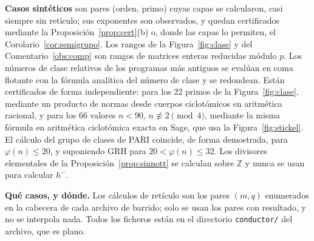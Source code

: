 \documentclass[11pt,a4paper]{article}
\theoremstyle{definition}
\newcommand{\ZZ}{\mathbb{Z}}
\begin{document}
\noindent\textbf{Casos sintéticos} son pares (orden, primo) cuyas capas se calcularon, casi siempre sin retículo; sus
exponentes son observados, y quedan certificados mediante la Proposición~\ref{prop:cert}(b) o, donde las capas lo
permiten, el Corolario~\ref{cor:semigrupo}. Los rangos de la
Figura~\ref{fig:clase} y del Comentario~\ref{obs:comp} son rangos de matrices enteras reducidas módulo $p$. Los números
de clase relativos de los programas más antiguos se evalúan en coma flotante con la fórmula analítica del número de
clase y se redondean. Están certificados de forma independiente: para los $22$ primos de la Figura~\ref{fig:clase},
mediante un producto de normas desde cuerpos ciclotómicos en aritmética racional, y para los $66$ valores $n<90$,
$n\not\equiv2\pmod4$, mediante la misma fórmula en aritmética ciclotómica exacta en Sage, que usa la
Figura~\ref{fig:stickel}. El cálculo del grupo de clases de PARI coincide, de forma demostrada, para $\varphi(n)\le20$, y
suponiendo GRH para $20<\varphi(n)\le32$. Los divisores elementales de la Proposición~\ref{prop:sinnott} se calculan
sobre $\ZZ$ y nunca se usan para calcular $h^-$.

\noindent\textbf{Qué casos, y dónde.} Los cálculos de retículo son los pares $(m,q)$ enumerados en la cabecera de cada
archivo de barrido; solo se usan los pares con resultado, y no se interpola nada. Todos los ficheros están en el directorio \texttt{conductor/} del archivo, que es plano.
\end{document}

